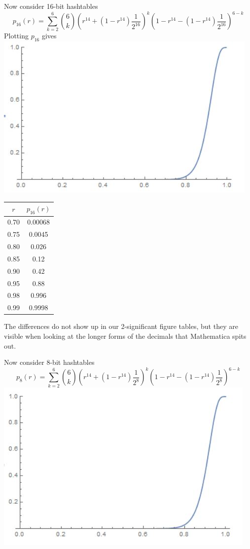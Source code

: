 \documentclass{article}
\begin{document}
Now consider 16-bit hashtables
$$p_{16}(r) = \sum\limits_{k=2}^6 {6 \choose k} (r^{14} + (1-r^{14}) \frac{1}{2^{16}})^k (1-r^{14} -  (1-r^{14}) \frac{1}{2^{16}})^{6-k}$$
Plotting $p_{16}$ gives\\
\includegraphics[scale=0.8]{p16.jpg}

\begin{center}
\begin{tabular}{ | c | c | }
\hline
$r$ & $p_{16}(r)$ \\
\hline\hline
0.70 & 0.00068 \\
\hline
0.75 & 0.0045\\
\hline
0.80 & 0.026\\
\hline
0.85 & 0.12\\
\hline
0.90 & 0.42\\
\hline
0.95 & 0.88\\
\hline
0.98 & 0.996 \\
\hline
0.99 & 0.9998 \\ 
\hline

\end{tabular}
\end{center}
The differences do not show up in our 2-significant figure tables, but they are visible when looking at the longer forms of the decimals that Mathematica spits out. 

Now consider 8-bit hashtables
$$p_{8}(r) = \sum\limits_{k=2}^6 {6 \choose k} (r^{14} + (1-r^{14}) \frac{1}{2^{8}})^k (1-r^{14} -  (1-r^{14}) \frac{1}{2^{8}})^{6-k}$$
\includegraphics[scale=0.8]{p8.jpg}
\end{document}
